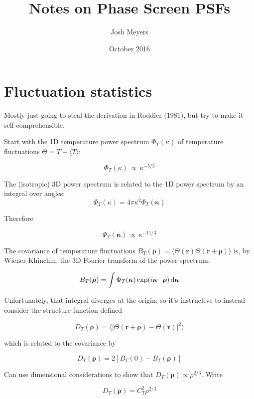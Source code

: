 \documentclass{article}
\title{Notes on Phase Screen PSFs}
\author{Josh Meyers}
\date{October 2016}
\begin{document}
\section{Fluctuation statistics}

Mostly just going to steal the derivation in Roddier (1981), but try to make it self-comprehensible.

Start with the 1D temperature power spectrum $\Phi_T(\kappa)$ of temperature fluctuations $\Theta =
T - \langle T \rangle$:

\begin{equation}
    \Phi_T(\kappa)\, \propto\, \kappa^{-5/3}
\end{equation}

The (isotropic) 3D power spectrum is related to the 1D power spectrum by an integral over angles:
\begin{equation}
    \Phi_T(\kappa) = 4 \pi \kappa^2 \Phi_T(\bm{\kappa})
\end{equation}

Therefore

\begin{equation}
    \Phi_T(\bm{\kappa})\, \propto\, \kappa^{-11/3}
\end{equation}

The covariance of temperature fluctuations $B_T(\bm\rho) = \langle \Theta(\bm{r})
\Theta(\bm{r}+\bm\rho)\rangle$ is, by Wiener-Khinchin, the 3D Fourier transform of the power
spectrum:

\begin{equation}
    B_T(\bm\rho) = \int \Phi_T(\bm{\kappa}) \exp(i \bm\kappa \cdot \bm\rho) \dif\bm\kappa
\end{equation}

Unfortunately, that integral diverges at the origin, so it's instructive to instead consider the
structure function defined

\begin{equation}
    D_T(\bm\rho) = \langle | \Theta(\bm{r} + \bm\rho) - \Theta(\bm{r})|^2\rangle
\end{equation}

which is related to the covariance by

\begin{equation}
    D_T(\bm\rho) = 2\left[B_T(0) - B_T(\bm\rho)\right]
\end{equation}

Can use dimensional considerations to show that $D_T(\bm\rho) \propto \rho^{2/3}$.  Write

\begin{equation}
    D_T(\bm\rho) = C^2_T \rho^{2/3}
\end{equation}
\end{document}
